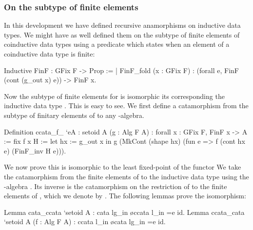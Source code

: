 \documentclass[ a4paper, UKenglish, cleveref, autoref, thm-restate]{lipics-v2021}
\newcommand{\mpav}[1]{\textcolor{red}{\textsc{Marco}: #1}}
\newcommand{\dcas}[1]{\textcolor{ForestGreen}{\textsc{David}: #1}}
\begin{document}
\subsubsection{On the subtype of finite elements}
In this development we have defined recursive anamorphisms on inductive data
types.  We might have as well defined them on the subtype of finite elements of
coinductive data types using a predicate which states when an element of a
coinductive data type is finite:
\begin{coqcode}
Inductive FinF : GFix F -> Prop :=
| FinF_fold (x : GFix F) : (forall e, FinF (cont (g_out x) e)) -> FinF x.
\end{coqcode}
Now the subtype  of finite elements for 
is isomorphic its corresponding the inductive data type . This is
easy to see. We first define a catamorphism  from the
subtype  of finitary elements of  to
any -algebra.
\begin{coqcode}
Definition ccata_f_ `{eA : setoid A} (g : Alg F A)
  : forall x : GFix F, FinF x -> A := fix f x H :=
    let hx := g_out x in
      g (MkCont (shape hx) (fun e => f (cont hx e) (FinF_inv H e))).
\end{coqcode}
We now prove this is isomorphic to the least fixed-point of the functor 
We take the catamorphism from the finite elements of  to the
inductive data type  using the -algebra . Its inverse is the catamorphism on the restriction of  to the finite elements of , which we denote by .
The following lemmas prove the isomorphism:
\begin{coqcode}
Lemma cata_ccata `{setoid A} : cata lg_in \o ccata l_in =e id.
Lemma ccata_cata `{setoid A} (f : Alg F A) : ccata l_in \o cata lg_in =e id.
\end{coqcode}


\end{document}
